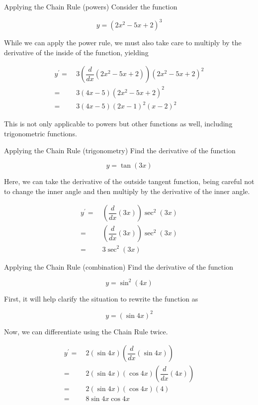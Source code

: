 \begin{example}{Applying the Chain Rule (powers)}
    Consider the function
    
    \[ y = \left( 2x^2 - 5x + 2 \right)^3 \]
    
    While we can apply the power rule, we must also take care to multiply by the derivative of the inside of the function, yielding
    
    \begin{align}
        y^\prime = \> &3 \left( \dfrac{d}{dx} \left( 2x^2 - 5x + 2 \right) \right) \left( 2x^2 - 5x + 2 \right)^2 \\
        = \> &3 \left( 4x - 5 \right) \left( 2x^2 - 5x + 2 \right)^2 \\
        = \> &3 \left( 4x - 5 \right) \left( 2x - 1 \right)^2 \left( x - 2 \right)^2
    \end{align}
\end{example}

This is not only applicable to powers but other functions as well, including trigonometric functions.

\begin{example}{Applying the Chain Rule (trigonometry)}
    Find the derivative of the function
    
    \[ y = \tan{\left( 3x \right)} \]
    
    Here, we can take the derivative of the outside tangent function, being careful not to change the inner angle and then multiply by the derivative of the inner angle.
    
    \begin{align}
        y^\prime = \> &\left( \dfrac{d}{dx} \left( 3x \right) \right) \sec^2{\left( 3x \right)} \\
        = \> &\left( \dfrac{d}{dx} \left( 3x \right) \right) \sec^2{\left( 3x \right)} \\
        = \> &3 \sec^2{\left( 3x \right)}
    \end{align}
\end{example}

\begin{example}{Applying the Chain Rule (combination)}
    Find the derivative of the function
    
    \[ y = \sin^2{\left( 4x \right)} \]
    
    First, it will help clarify the situation to rewrite the function as
    
    \[ y = \left( \sin{4x} \right)^2 \]
    
    Now, we can differentiate using the Chain Rule twice.
    
    \begin{align}
        y^\prime = \> &2 \left( \sin{4x} \right) \left( \dfrac{d}{dx} \left( \sin{4x} \right) \right) \\
        = \> &2 \left( \sin{4x} \right) \left( \cos{4x} \right) \left( \dfrac{d}{dx} \left( 4x \right) \right) \\
        = \> &2 \left( \sin{4x} \right) \left( \cos{4x} \right) \left( 4 \right) \\
        = \> &8\sin{4x} \cos{4x}
    \end{align}
\end{example}


